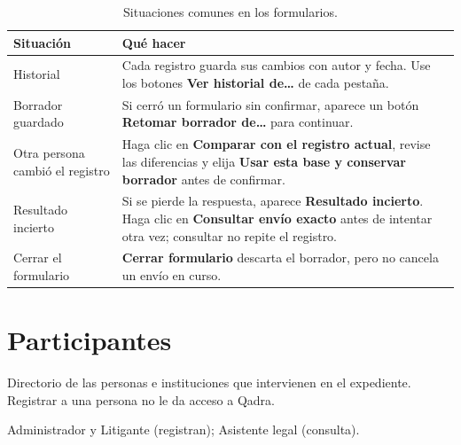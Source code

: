 \begin{table}[H]
  \centering
  \caption{Situaciones comunes en los formularios.}\label{tab:situaciones-comunes}
  \begin{tabularx}{\textwidth}{L{3.6cm} Y}
    \toprule
    \textbf{Situación} & \textbf{Qué hacer} \\
    \midrule
    Historial
      & Cada registro guarda sus cambios con autor y fecha. Use los botones
        \textbf{Ver historial de\ldots} de cada pestaña. \\
    Borrador guardado
      & Si cerró un formulario sin confirmar, aparece un botón
        \textbf{Retomar borrador de\ldots} para continuar. \\
    Otra persona cambió el registro
      & Haga clic en \textbf{Comparar con el registro actual}, revise las
        diferencias y elija \textbf{Usar esta base y conservar borrador}
        antes de confirmar. \\
    Resultado incierto
      & Si se pierde la respuesta, aparece \textbf{Resultado incierto}. Haga
        clic en \textbf{Consultar envío exacto} antes de intentar otra vez;
        consultar no repite el registro. \\
    Cerrar el formulario
      & \textbf{Cerrar formulario} descarta el borrador, pero no cancela un
        envío en curso. \\
    \bottomrule
  \end{tabularx}
\end{table}

\section{Participantes}\label{sec:participantes}

\paraque Directorio de las personas e instituciones que intervienen en el
expediente. Registrar a una persona no le da acceso a Qadra.

\disponible Administrador y Litigante (registran); Asistente legal
(consulta).

